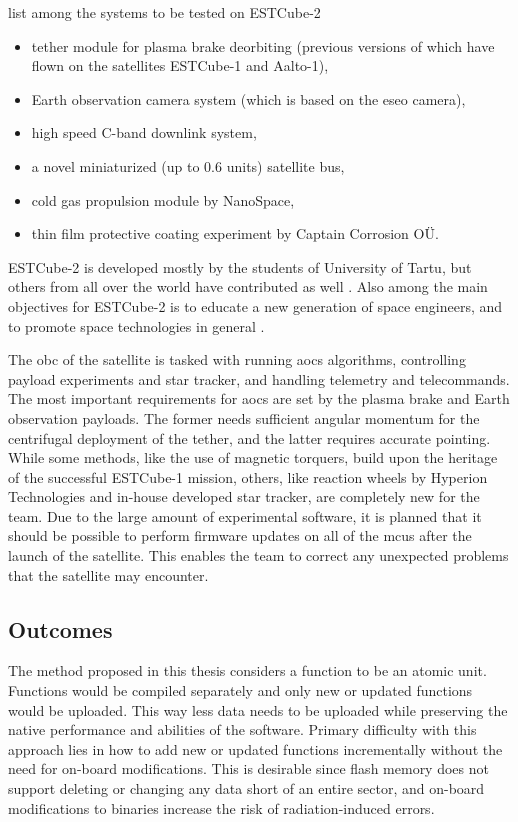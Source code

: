 \textcite{Iakubivskyi2016} list among the systems to be tested on ESTCube-2
\begin{itemize}
  \item tether module for plasma brake deorbiting (previous versions of which have flown on the satellites ESTCube-1 and Aalto-1),
  \item Earth observation camera system (which is based on the \gls{eseo} camera),
  \item high speed C-band downlink system,
  \item a novel miniaturized (up to 0.6 units) satellite bus,
  \item cold gas propulsion module by NanoSpace,
  \item thin film protective coating experiment by Captain Corrosion OÜ.
\end{itemize}

ESTCube-2 is developed mostly by the students of University of Tartu, but others from all over the world have contributed as well \cite{Ehrpais2016}. Also among the main objectives for ESTCube-2 is to educate a new generation of space engineers, and to promote space technologies in general \cite{Iakubivskyi2016}.

The \gls{obc} of the satellite is tasked with running \gls{aocs} algorithms, controlling payload experiments and star tracker, and handling telemetry and telecommands. The most important requirements for \gls{aocs} are set by the plasma brake and Earth observation payloads. The former needs sufficient angular momentum for the centrifugal deployment of the tether, and the latter requires accurate pointing. While some methods, like the use of magnetic torquers, build upon the heritage of the successful ESTCube-1 mission, others, like reaction wheels by Hyperion Technologies and in-house developed star tracker, are completely new for the team. Due to the large amount of experimental software, it is planned that it should be possible to perform firmware updates on all of the \glspl{mcu} after the launch of the satellite. This enables the team to correct any unexpected problems that the satellite may encounter. \cite{Ehrpais2016}


\subsection{Outcomes}

The method proposed in this thesis considers a function to be an atomic unit. Functions would be compiled separately and only new or updated functions would be uploaded. This way less data needs to be uploaded while preserving the native performance and abilities of the software. Primary difficulty with this approach lies in how to add new or updated functions incrementally without the need for on-board modifications. This is desirable since flash memory does not support deleting or changing any data short of an entire sector, and on-board modifications to binaries increase the risk of radiation-induced errors.

